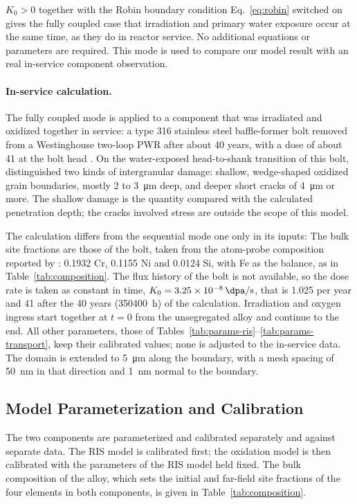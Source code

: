 \documentclass[3p,times,nonatbib]{elsarticle} %
\begin{document}
\(K_0>0\) together with the Robin boundary condition Eq.~\eqref{eq:robin} switched on gives the fully coupled case that irradiation and primary water exposure occur at the same time, as they do in reactor service. No additional equations or parameters are required. This mode is used to compare our model result with an real in-service component observation.

\paragraph{In-service calculation.}
The fully coupled mode is applied to a component that was irradiated and
oxidized together in service: a type 316 stainless steel baffle-former bolt
removed from a Westinghouse two-loop PWR after about 40 years, with a dose of
about \SI{41}{\dpa} at the bolt head
\cite{gussev2023microstructure,lach2024inservice,lach2025inservice}. On
the water-exposed head-to-shank transition of this bolt,
\textcite{gussev2023microstructure} distinguished two kinds of intergranular
damage: shallow, wedge-shaped oxidized grain boundaries, mostly 2 to
\SI{3}{\micro\metre} deep, and deeper short cracks of \SI{4}{\micro\metre} or more. The shallow damage is the quantity compared with the calculated
penetration depth; the cracks involved stress are outside the scope of this model.

The calculation differs from the sequential mode one only in its inputs: The bulk site fractions are those of the bolt, taken from the atom-probe composition reported by \textcite{lach2024inservice}: 0.1932 Cr, 0.1155 Ni and 0.0124 Si, with Fe as the balance, as in Table~\ref{tab:composition}. The flux history of the bolt is not
available, so the dose rate is taken as
constant in time, \(K_0=\SI{3.25e-8}{\dpa\per\second}\), that is
\SI{1.025}{\dpa} per year and \SI{41}{\dpa} after the 40 years
(\SI{350400}{h}) of the calculation. Irradiation and oxygen ingress
start together at \(t=0\) from the unsegregated alloy and continue to the end.
All other parameters, those of
Tables~\ref{tab:params-ris}--\ref{tab:params-transport}, keep their
calibrated values; none is adjusted to the in-service data. The domain is
extended to \SI{5}{\micro\metre} along the boundary, with a mesh spacing of
\SI{50}{nm} in that direction and \SI{1}{nm} normal to the boundary.

\subsection{Model Parameterization and Calibration}
\label{sec:methodCalibration}
The two components are parameterized and calibrated separately and against
separate data. The RIS model is calibrated first; the oxidation model is then
calibrated with the parameters of the RIS model held fixed. The bulk composition
of the alloy, which sets the initial and far-field site fractions of the four
elements in both components, is given in Table~\ref{tab:composition}.
\end{document}
